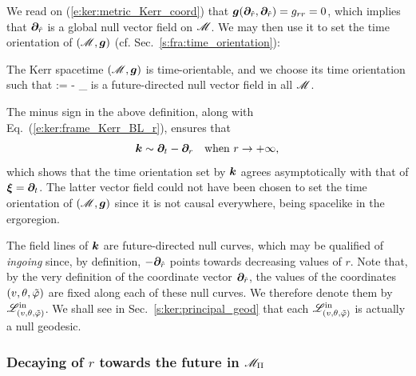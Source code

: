 We read on (\ref{e:ker:metric_Kerr_coord}) that
$\bm{g}(\bm{\partial}_{\hat{r}},\bm{\partial}_{\hat{r}}) = g_{rr} = 0$, which
implies that $\bm{\partial}_{\hat{r}}$ is a global null vector field on $\mathscr{M}$.
We may then use it to set the time orientation of $(\mathscr{M},\bm{g})$ (cf. Sec.~\ref{s:fra:time_orientation}):
\begin{prop}
The Kerr spacetime $(\mathscr{M},\bm{g})$ is time-orientable, and we choose its time orientation
such that
\be \label{e:ker:def_k_hat_r}
     := - \wpar_{}
\ee
is a future-directed null vector field in all $\mathscr{M}$.
\end{prop}

\begin{remark}
The minus sign
in the above definition, along with Eq.~(\ref{e:ker:frame_Kerr_BL_r}),
ensures that
\[
    \bm{k} \sim \bm{\partial}_t -  \bm{\partial}_r  \quad\mbox{when}\
            r \rightarrow +\infty ,
\]
which shows that the time orientation set by $\bm{k}$ agrees asymptotically
with that of $\bm{\xi}=\bm{\partial}_t$. The latter vector field could not have been
chosen to set the time orientation of $(\mathscr{M},\bm{g})$ since it is not
causal everywhere, being spacelike in the ergoregion.
\end{remark}

The field lines
of $\bm{k}$ are future-directed null curves,
which may be qualified of \emph{ingoing} since, by definition, $-\bm{\partial}_{\hat{r}}$ points towards
decreasing values of $r$. Note that, by the very definition of
the coordinate vector $\bm{\partial}_{\hat{r}}$,
the values of the coordinates $(v,\theta,{\tilde\varphi})$ are fixed along each of these
null curves. We therefore denote them by $\mathscr{L}^{\rm in}_{(v,\theta,{\tilde\varphi})}$.
We shall see in Sec.~\ref{s:ker:principal_geod} that each $\mathscr{L}^{\rm in}_{(v,\theta,{\tilde\varphi})}$ is actually a null geodesic.

\subsubsection{Decaying of $r$ towards the future in $\mathscr{M}_{\rm II}$}

